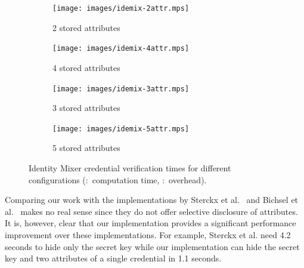 \begin{figure}[ht]
  \centering
  \begin{subfigure}[b]{0.45\textwidth}
    \texttt{[image: images/idemix-2attr.mps]}
    \caption{2 stored attributes}
    \label{fig:2attr-sle78}
  \end{subfigure}
  \begin{subfigure}[b]{0.45\textwidth}
    \texttt{[image: images/idemix-4attr.mps]}
    \caption{4 stored attributes}
    \label{fig:4attr-sle78}
  \end{subfigure}

  \vspace{5mm}

  \begin{subfigure}[b]{0.45\textwidth}
    \texttt{[image: images/idemix-3attr.mps]}
    \caption{3 stored attributes}
    \label{fig:3attr-sle78}
  \end{subfigure}
  \begin{subfigure}[b]{0.45\textwidth}
    \texttt{[image: images/idemix-5attr.mps]}
    \caption{5 stored attributes}
    \label{fig:5attr-sle78}
  \end{subfigure}

  \caption[Identity Mixer credential verification times for different configurations.]{
    Identity Mixer credential verification times for different configurations
    (:~computation time,
      :~overhead).}
  \label{fig:proving}
\end{figure}

Comparing our work with the implementations by Sterckx et al.~\cite{Sterckx09}
and Bichsel et al.~\cite{BichselCGS2009} makes no real sense since they do not
offer selective disclosure of attributes. It is, however, clear that our
implementation provides a significant performance improvement over these
implementations. For example, Sterckx et al. need 4.2 seconds to hide only the
secret key while our implementation can hide the secret key and two attributes
of a single credential in 1.1 seconds.

